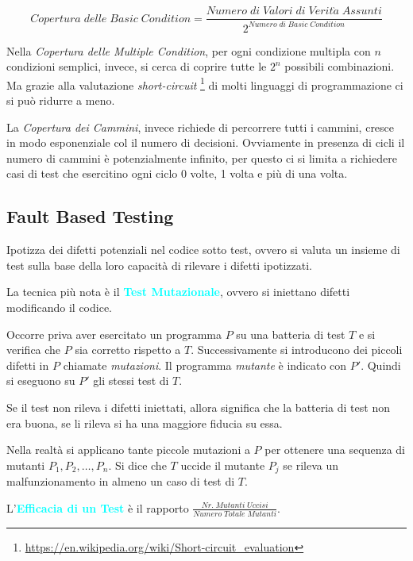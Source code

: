 \begin{equation*}
    Copertura\;delle\;Basic\;Condition = \frac{Numero\;di\;Valori\;di\;Verit\grave{a}\;Assunti}{2^{Numero\;di\;Basic\;Condition}}
\end{equation*}

Nella \emph{Copertura delle Multiple Condition}, per ogni condizione multipla con $n$
condizioni semplici, invece, si cerca di coprire tutte le $2^n$ possibili combinazioni.
Ma grazie alla valutazione \emph{short-circuit} \footnote{\url{https://en.wikipedia.org/wiki/Short-circuit_evaluation}}
di molti linguaggi di programmazione ci si può ridurre a meno.

La \emph{Copertura dei Cammini}, invece richiede di percorrere tutti i cammini, cresce in modo
esponenziale col il numero di decisioni. Ovviamente in presenza di cicli
il numero di cammini è potenzialmente infinito, per questo ci si limita a
richiedere casi di test che esercitino ogni ciclo 0 volte, 1 volta e più di una volta.

\subsection{Fault Based Testing}

Ipotizza dei difetti potenziali nel codice sotto test, ovvero si valuta
un insieme di test sulla base della loro capacità di rilevare i difetti ipotizzati.

La tecnica più nota è il \textbf{\textcolor{cyan}{Test Mutazionale}}, ovvero
si iniettano difetti modificando il codice.

Occorre priva aver esercitato un programma $P$ su una batteria di test $T$
e si verifica che $P$ sia corretto rispetto a $T$. Successivamente si introducono
dei piccoli difetti in $P$ chiamate \emph{mutazioni}. Il programma \emph{mutante} è
indicato con $P'$. Quindi si eseguono su $P'$ gli stessi test di $T$.

Se il test non rileva i difetti iniettati, allora significa che la batteria di test non
era buona, se li rileva si ha una maggiore fiducia su essa.

Nella realtà si applicano tante piccole mutazioni a $P$ per ottenere una
sequenza di mutanti $P_1, P_2, \dots, P_n$. Si dice che $T$ uccide il mutante
$P_j$ se rileva un malfunzionamento in almeno un caso di test di $T$.

L'\textbf{\textcolor{cyan}{Efficacia di un Test}} è il rapporto $\frac{Nr.\;Mutanti\;Uccisi}{Numero\;Totale\;Mutanti}$.

